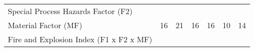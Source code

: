 \begin{landscape}
\begin{table}[]
\begin{tabular}{@{}lcccccc@{}}
Special   Process Hazards Factor (F2)     &                                                                          &                                                                                       &                                                                                   &                                                                                  &                                                                                          &                                                                                           \\
Material Factor (MF)                      & 16                                                                       & 21                                                                                    & 16                                                                                & 16                                                                               & 10                                                                                       & 14                                                                                        \\
Fire and Explosion Index (F1   x F2 x MF) &                                                                          &                                                                                       &                                                                                   &                                                                                  &                                                                                          &                                                                                           \\ \bottomrule
\end{tabular}
\end{table}
\end{landscape}